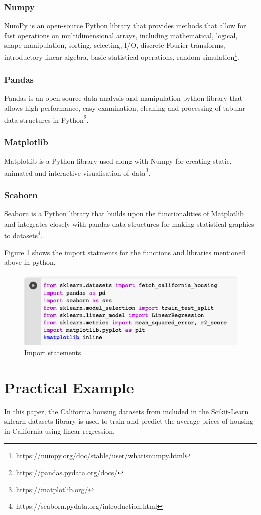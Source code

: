\documentclass[conference]{IEEEtran}
\begin{document}
\subsubsection{Numpy}
NumPy is an open-source Python library that provides methods that allow for fast operations on multidimensional arrays, including mathematical, logical, shape manipulation, sorting, selecting, I/O, discrete Fourier transforms, introductory linear algebra, basic statistical operations, random simulation\footnote{https://numpy.org/doc/stable/user/whatisnumpy.html}.
\subsubsection{Pandas}
Pandas is an open-source data analysis and manipulation python library that allows high-performance, easy examination, cleaning and processing of tabular data structures in Python\footnote{https://pandas.pydata.org/docs/}.
\subsubsection{Matplotlib}
Matplotlib is a Python library used along with Numpy for creating static, animated and interactive visualisation of data\footnote{https://matplotlib.org/}.
\subsubsection{Seaborn}
Seaborn is a Python library that builds upon the functionalities of Matplotlib and integrates closely with pandas data structures for making statistical graphics to datasets\footnote{https://seaborn.pydata.org/introduction.html}.

 Figure \ref{fig:placeholder} shows the import statments for the functions and libraries mentioned above in python.
 \begin{figure}[htbp]
	\centerline{\includegraphics [scale=0.45]{figures/import_statements.png}}
	\caption{Import statements}
	\label{fig:placeholder}
\end{figure}
\section{Practical Example}
In this paper, the California housing datasets from \cite{KELLEYPACE1997291} included in the Scikit-Learn sklearn datasets library is used to train and predict the average prices of housing in California using linear regression. 
\end{document}

